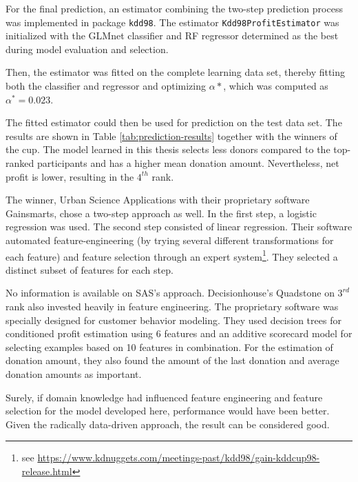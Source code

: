 \documentclass[
  11pt,
  a4paper,
  DIV=12,captions=tableheading,oneside,titlepage]{scrbook}
\begin{document}
For the final prediction, an estimator combining the two-step prediction process was implemented in package \texttt{kdd98}. The estimator \texttt{Kdd98ProfitEstimator} was initialized with the GLMnet classifier and RF regressor determined as the best during model evaluation and selection.

Then, the estimator was fitted on the complete learning data set, thereby fitting both the classifier and regressor and optimizing \(\alpha*\), which was computed as \(\alpha^* = 0.023\).

The fitted estimator could then be used for prediction on the test data set. The results are shown in Table \ref{tab:prediction-results} together with the winners of the cup. The model learned in this thesis selects less donors compared to the top-ranked participants and has a higher mean donation amount. Nevertheless, net profit is lower, resulting in the \(4^{th}\) rank.

The winner, Urban Science Applications with their proprietary software Gainsmarts, chose a two-step approach as well. In the first step, a logistic regression was used. The second step consisted of linear regression. Their software automated feature-engineering (by trying several different transformations for each feature) and feature selection through an expert system\footnote{see \url{https://www.kdnuggets.com/meetings-past/kdd98/gain-kddcup98-release.html}}. They selected a distinct subset of features for each step.

No information is available on SAS's approach. Decisionhouse's Quadstone on \(3^{rd}\) rank also invested heavily in feature engineering. The proprietary software was specially designed for customer behavior modeling. They used decision trees for conditioned profit estimation using 6 features and an additive scorecard model for selecting examples based on 10 features in combination. For the estimation of donation amount, they also found the amount of the last donation and average donation amounts as important.

Surely, if domain knowledge had influenced feature engineering and feature selection for the model developed here, performance would have been better. Given the radically data-driven approach, the result can be considered good.
\end{document}
